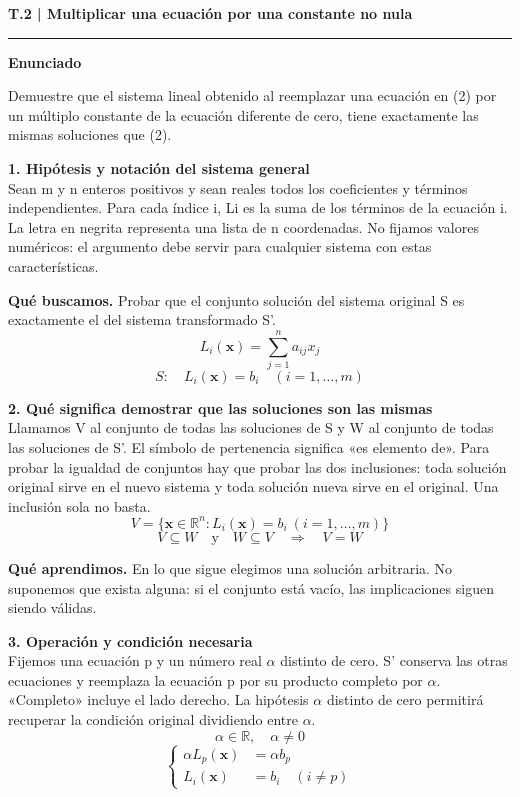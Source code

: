 \documentclass[11pt,a4paper,landscape]{article}
\newcommand{\titulo}[1]{{\LARGE\bfseries #1}\par\smallskip\hrule\medskip}
\begin{document}
\normalsize
\newpage{}\hypertarget{1.1-T.2}{}
\titulo{T.2 | Multiplicar una ecuación por una constante no nula}
\textbf{Enunciado}\par Demuestre que el sistema lineal obtenido al reemplazar una ecuación en (2) por un múltiplo constante de la ecuación diferente de cero, tiene exactamente las mismas soluciones que (2).
\par\medskip\large
\noindent\begin{minipage}{\linewidth}\textbf{1. Hipótesis y notación del sistema general}\\[2pt]Sean m y n enteros positivos y sean reales todos los coeficientes y términos independientes. Para cada índice i, Li es la suma de los términos de la ecuación i. La letra en negrita representa una lista de n coordenadas. No fijamos valores numéricos: el argumento debe servir para cualquier sistema con estas características.
\par\smallskip\textbf{Qué buscamos.} Probar que el conjunto solución del sistema original S es exactamente el del sistema transformado S'.
\[L_i(\mathbf{x})=\sum_{j=1}^{n}a_{ij}x_j\]
\[S:\quad L_i(\mathbf{x})=b_i\quad (i=1,\ldots,m)\]
\end{minipage}\par\medskip
\noindent\begin{minipage}{\linewidth}\textbf{2. Qué significa demostrar que las soluciones son las mismas}\\[2pt]Llamamos V al conjunto de todas las soluciones de S y W al conjunto de todas las soluciones de S'. El símbolo de pertenencia significa «es elemento de». Para probar la igualdad de conjuntos hay que probar las dos inclusiones: toda solución original sirve en el nuevo sistema y toda solución nueva sirve en el original. Una inclusión sola no basta.
\[V=\{\mathbf{x}\in\mathbb{R}^{n}:L_i(\mathbf{x})=b_i\ (i=1,\ldots,m)\}\]
\[V\subseteq W\quad\mathrm{y}\quad W\subseteq V\quad\Longrightarrow\quad V=W\]
\par\smallskip\textbf{Qué aprendimos.} En lo que sigue elegimos una solución arbitraria. No suponemos que exista alguna: si el conjunto está vacío, las implicaciones siguen siendo válidas.
\end{minipage}\par\medskip
\noindent\begin{minipage}{\linewidth}\textbf{3. Operación y condición necesaria}\\[2pt]Fijemos una ecuación p y un número real $\alpha$ distinto de cero. S' conserva las otras ecuaciones y reemplaza la ecuación p por su producto completo por $\alpha$. «Completo» incluye el lado derecho. La hipótesis $\alpha$ distinto de cero permitirá recuperar la condición original dividiendo entre $\alpha$.
\[\alpha\in\mathbb{R},\quad\alpha\ne0\]
\[\left\{\begin{aligned}\alpha L_p(\mathbf{x})&=\alpha b_p\\L_i(\mathbf{x})&=b_i\quad(i\ne p)\end{aligned}\right.\]
\end{minipage}\par\medskip
\end{document}

